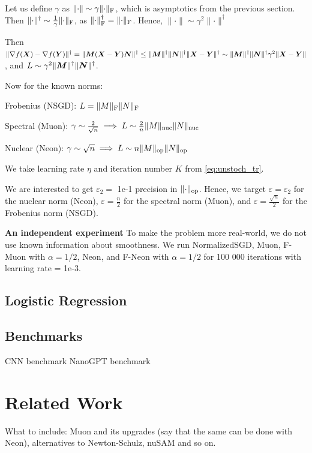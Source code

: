\documentclass{article} %
\newcommand{\norm}[1]{\lVert #1\rVert}
\renewcommand{\epsilon}{\varepsilon}
\DeclarePairedDelimiter{\normf}{\|}{\|_\mathrm{F}}
\DeclarePairedDelimiter{\norms}{\|}{\|_{\mathrm{op}}}
\DeclarePairedDelimiter{\normn}{\|}{\|_{\mathrm{nuc}}}
\begin{document}
    Let us define $\gamma$ as $\norm{\cdot} \sim \gamma \normf{\cdot}$, which is asymptotics from the previous section. Then $\norm{\cdot}^\dagger \sim \frac{1}{\gamma}\normf{\cdot}$, as $\normf{\cdot}^\dagger = \normf{\cdot}$. Hence, $\norm{\cdot} \sim \gamma^2 \norm{\cdot}^\dagger$

    Then $\norm{\nabla f(\mX) - \nabla f(\mY)}^\dagger = \norm{\mM (\mX - \mY) \mN}^\dagger \leq \norm{\mM}^\dagger \norm{\mN}^\dagger \norm{\mX - \mY}^\dagger \sim \norm{\mM}^\dagger \norm{\mN}^\dagger \gamma^2 \norm{\mX - \mY}$, and $L \sim \gamma^2 \norm{\mM}^\dagger \norm{\mN}^\dagger$.
    
    Now for the known norms:

    Frobenius (NSGD): $L = \normf{M} \normf{N}$

    Spectral (Muon): $\gamma \sim \frac{2}{\sqrt{n}} \implies L \sim \frac{2}{n}\normn{M}\normn{N}$
    
    Nuclear (Neon): $\gamma \sim \sqrt{n} \implies L \sim n\norms{M}\norms{N}$

    We take learning rate $\eta$ and iteration number $K$ from \cref{eq:unstoch_tr}.


    We are interested to get $\epsilon_2=$ 1e-1 precision in $\norms{\cdot}$. Hence, we target $\epsilon = \epsilon_2$ for the nuclear norm (Neon), $\epsilon = \frac{n}{2}$ for the spectral norm (Muon), and $\epsilon = \frac{\sqrt{n}}{2}$ for the Frobenius norm (NSGD).

    {\bf An independent experiment}
    To make the problem more real-world, we do not use known information about smoothness. We run NormalizedSGD, Muon, F-Muon with $\alpha=1/2$, Neon, and F-Neon with $\alpha=1/2$ for 100 000 iterations with learning rate = 1e-3.
    
    \subsection{Logistic Regression}
    \subsection{Benchmarks}
    CNN benchmark
    NanoGPT benchmark

\section{Related Work}
What to include: Muon and its upgrades (say that the same can be done with Neon), alternatives to Newton-Schulz, nuSAM and so on. 
\end{document}
